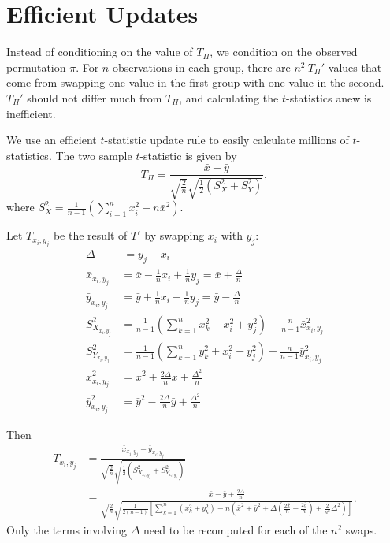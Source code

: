\section{Efficient Updates}
\label{S:efficient-updates}
Instead of conditioning on the value of $T_{\Pi}$, we condition on the
observed permutation $\pi$.  For $n$ observations in each group, there
are $n^2 \: T_{\Pi}'$ values that come from swapping one value in the first
group with one value in the second.  $T_{\Pi}'$ should not differ much from
$T_{\Pi}$, and calculating the $t$-statistics anew is inefficient.

We use an efficient $t$-statistic update rule to easily calculate
millions of $t$-statistics.  The two sample $t$-statistic is given by
\begin{equation*}
  T_{\Pi} = \frac{\bar{x}-\bar{y}}
  {\sqrt{\frac{2}{n}}\sqrt{\frac{1}{2}(S_X^2+S_Y^2)}},
\end{equation*}
where $S_X^2=\frac{1}{n-1}(\sum_{i=1}^nx_i^2-n\bar{x}^2)$.

Let $T_{x_i,y_j}$ be the result of $T'$ by swapping $x_i$ with $y_j$:
\begin{align*}
  \Delta &\:= y_j-x_i \\
  \bar{x}_{x_i,y_j} &= \bar{x}-\frac{1}{n}x_i+\frac{1}{n}y_j =
  \bar{x}+\frac{\Delta}{n} \\
  \bar{y}_{x_i,y_j} &= \bar{y}+\frac{1}{n}x_i-\frac{1}{n}y_j =
  \bar{y}-\frac{\Delta}{n} \\
  S_{X_{x_i,y_j}}^2 &= \frac{1}{n-1} \left (\sum_{k=1}^n x_k^2 - x_i^2 +
  y_j^2 \right ) - \frac{n}{n-1}\bar{x}^2_{x_i,y_j} \\
  S_{Y_{x_i,y_j}}^2 &= \frac{1}{n-1} \left (\sum_{k=1}^n y_k^2 + x_i^2 -
  y_j^2 \right ) - \frac{n}{n-1}\bar{y}^2_{x_i,y_j} \\
  \bar{x}_{x_i,y_j}^2 &= \bar{x}^2 + \frac{2\Delta}{n}\bar{x} +
  \frac{\Delta^2}{n} \\
  \bar{y}_{x_i,y_j}^2 &= \bar{y}^2 - \frac{2\Delta}{n}\bar{y} + \frac{\Delta^2}{n}
\end{align*}

Then
\begin{align*}
  T_{x_i,y_j} &= \frac{\bar{x}_{x_i,y_j}-\bar{y}_{x_i,y_j}}
  {\sqrt{\frac{2}{n}}\sqrt{\frac{1}{2}(S_{X_{x_i,y_j}}^2+S_{Y_{x_i,y_j}}^2)}}\\
  &= \frac{\bar{x}-\bar{y}+\frac{2\Delta}{n}}
  {\sqrt{\frac{2}{n}}\sqrt{\frac{1}{2(n-1)}[\sum_{k=1}^n (x_k^2+y_k^2)
      -n(\bar{x}^2+\bar{y}^2+\Delta(\frac{2\bar{x}}{n}
      -\frac{2\bar{y}}{n})+\frac{2}{n^2}\Delta^2)]}}.
\end{align*}
Only the terms involving $\Delta$ need to be recomputed for each of the $n^2$ swaps.
